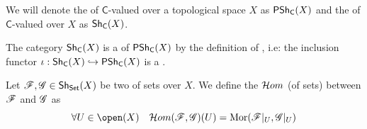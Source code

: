 \documentclass[../main.tex]{subfiles}
\begin{document}
\begin{notation}
  We will denote the  of \(\mathsf{C}\)-valued  over a topological space \(X\) as \(\mathsf{PSh}_{\mathsf{C}}(X)\) and the  of \(\mathsf{C}\)-valued  over \(X\) as \(\mathsf{Sh}_{\mathsf{C}}(X)\).
\end{notation}

\begin{remark} \label{remark:presheaf-full-subcategory}
  The category \(\mathsf{Sh}_{\mathsf{C}}(X)\) is a  of \(\mathsf{PSh}_{\mathsf{C}}(X)\) by the definition of , i.e: the inclusion functor \(\iota: \mathsf{Sh}_{\mathsf{C}}(X) \hookrightarrow \mathsf{PSh}_{\mathsf{C}}(X)\) is a .
\end{remark}

\begin{definition} \label{def:hom-sheaf}
  Let \(\mathscr{F}, \mathscr{G} \in \mathsf{Sh}_{\mathsf{Set}}(X)\) be two  of sets over \(X\).
  We define the \(\mathcal{H}om\)  (of sets) between \(\mathscr{F}\) and \(\mathscr{G}\) as
  \begin{equation*}
    \forall U \in \open(X) \quad \HomS(\sheaf{F}, \sheaf{G})(U) = \Mor(\sheaf{F}|_{U}, \sheaf{G}|_{U})
  \end{equation*}
\end{definition}
\end{document}
